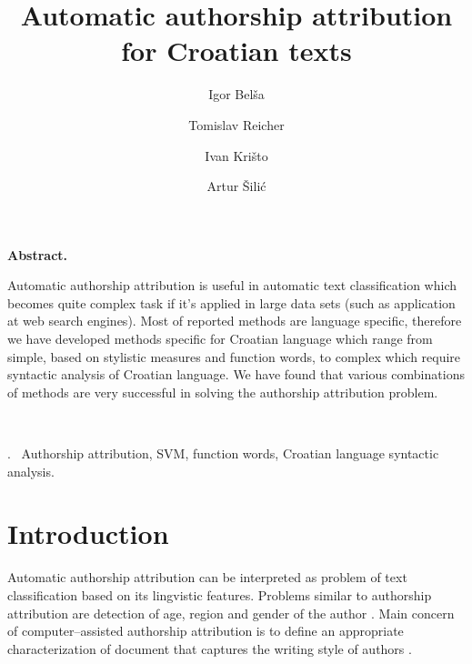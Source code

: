 \documentclass[11pt,english]{article}
\let\LaTeXtitle\title
\renewcommand{\title}[1]{\LaTeXtitle{\Large \textbf{#1}}}
\renewenvironment{abstract}
{\noindent \large \bf Abstract. \normalsize \begin{it}}
{\end{it}\\}
\newenvironment{keywords}
{\noindent {\large {\bf Keywords}}.~}{}
\begin{document}
\title{Automatic authorship attribution for Croatian texts}
\author{Igor Belša}
\author{Tomislav Reicher}
\author{Ivan Krišto}
\author{Artur Šilić}

\date{}

\maketitle

\thispagestyle{empty}
\pagestyle{empty}
\begin{multicols}{2}


\begin{abstract}
Automatic authorship attribution is useful in automatic text classification
which becomes quite complex task if it's applied in large data sets (such as
application at web search engines). Most of reported methods are language
specific, therefore we have developed methods specific for Croatian language
which range from simple, based on stylistic measures and function words, to
complex which require syntactic analysis of Croatian language. We have found that
various combinations of methods are very successful in solving the authorship
attribution problem.
\end{abstract}

\begin{keywords}
Authorship attribution, SVM, function words, Croatian language syntactic
analysis.
\end{keywords}

\section{Introduction}
Automatic authorship attribution can be interpreted as problem of text
classification based on its lingvistic features. Problems similar to authorship
attribution are detection of age, region and gender of the author
\citep{luyckx2005shallow}. Main concern of computer--assisted authorship
attribution is to define an appropriate characterization of document that
captures the writing style of authors \citep{coyotl2006authorship}.



\end{multicols}
\end{document}
